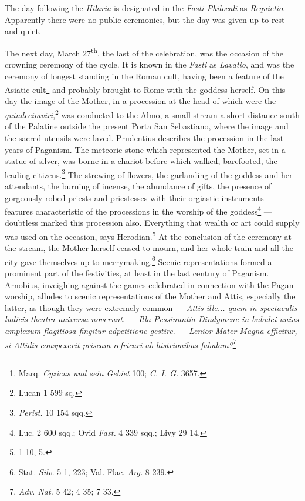 \documentclass[a4paper, 11pt, oneside, polutonikogreek, english]{article}
\begin{document}
The day following the \emph{Hilaria} is designated in the \emph{Fasti Philocali} as \emph{Requietio}. Apparently there were no public ceremonies, but the day was given up to rest and quiet.

The next day, March 27\textsuperscript{th}, the last of the celebration, was the occasion of the crowning ceremony of the cycle. It is known in the \emph{Fasti} as \emph{Lavatio}, and was the ceremony of longest standing in the Roman cult, having been a feature of the Asiatic cult\footnote{Marq. \emph{Cyzicus und sein Gebiet} 100; \emph{C. I. G.} 3657.} and probably brought to Rome with the goddess herself. On this day the image of the Mother, in a procession at the head of which were the \emph{quindecimviri},\footnote{Lucan 1 599 sq.} was conducted to the Almo, a small stream a short distance south of the Palatine outside the present Porta San Sebastiano, where the image and the sacred utensils were laved. Prudentius describes the procession in the last years of Paganism. The meteoric stone which represented the Mother, set in a statue of silver, was borne in a chariot before which walked, barefooted, the leading citizens.\footnote{\emph{Perist.} 10 154 sqq.} The strewing of flowers, the garlanding of the goddess and her attendants, the burning of incense, the abundance of gifts, the presence of gorgeously robed priests and priestesses with their orgiastic instruments --- features characteristic of the processions in the worship of the goddess\footnote{Luc. 2 600 sqq.; Ovid \emph{Fast.} 4 339 sqq.; Livy 29 14.} --- doubtless marked this procession also. Everything that wealth or art could supply was used on the occasion, says Herodian.\footnote{1 10, 5.} At the conclusion of the ceremony at the stream, the Mother herself ceased to mourn, and her whole train and all the city gave themselves up to merrymaking.\footnote{Stat. \emph{Silv.} 5 1, 223; Val. Flac. \emph{Arg.} 8 239.} Scenic representations formed a prominent part of the festivities, at least in the last century of Paganism. Arnobius, inveighing against the games celebrated in connection with the Pagan worship, alludes to scenic representations of the Mother and Attis, especially the latter, as though they were extremely common --- \emph{Attis ille... quem in spectaculis ludicis theatra universa noverunt}. --- \emph{Illa Pessinuntia Dindymene in bubulci unius amplexum flagitiosa fingitur adpetitione gestire}. --- \emph{Lenior Mater Magna efficitur, si Attidis conspexerit priscam refricari ab histrionibus fabulam?}\footnote{\emph{Adv. Nat.} 5 42; 4 35; 7 33.}
\end{document}
